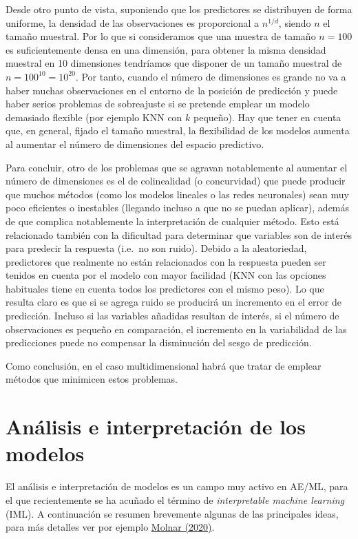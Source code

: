 \documentclass[]{book}
\theoremstyle{break}
\theoremstyle{definition}
\theoremstyle{definition}
\theoremstyle{definition}
\theoremstyle{remark}
\begin{document}
Desde otro punto de vista, suponiendo que los predictores se distribuyen
de forma uniforme, la densidad de las observaciones es proporcional a
\(n^{1/d}\), siendo \(n\) el tamaño muestral. Por lo que si consideramos
que una muestra de tamaño \(n=100\) es suficientemente densa en una
dimensión, para obtener la misma densidad muestral en 10 dimensiones
tendríamos que disponer de un tamaño muestral de
\(n = 100^{10} = 10^{20}\). Por tanto, cuando el número de dimensiones
es grande no va a haber muchas observaciones en el entorno de la
posición de predicción y puede haber serios problemas de sobreajuste si
se pretende emplear un modelo demasiado flexible (por ejemplo KNN con
\(k\) pequeño). Hay que tener en cuenta que, en general, fijado el
tamaño muestral, la flexibilidad de los modelos aumenta al aumentar el
número de dimensiones del espacio predictivo.

Para concluir, otro de los problemas que se agravan notablemente al
aumentar el número de dimensiones es el de colinealidad (o concurvidad)
que puede producir que muchos métodos (como los modelos lineales o las
redes neuronales) sean muy poco eficientes o inestables (llegando
incluso a que no se puedan aplicar), además de que complica notablemente
la interpretación de cualquier método. Esto está relacionado también con
la dificultad para determinar que variables son de interés para predecir
la respuesta (i.e.~no son ruido). Debido a la aleatoriedad, predictores
que realmente no están relacionados con la respuesta pueden ser tenidos
en cuenta por el modelo con mayor facilidad (KNN con las opciones
habituales tiene en cuenta todos los predictores con el mismo peso). Lo
que resulta claro es que si se agrega ruido se producirá un incremento
en el error de predicción. Incluso si las variables añadidas resultan de
interés, si el número de observaciones es pequeño en comparación, el
incremento en la variabilidad de las predicciones puede no compensar la
disminución del sesgo de predicción.

Como conclusión, en el caso multidimensional habrá que tratar de emplear
métodos que minimicen estos problemas.

\section{Análisis e interpretación de los
modelos}\label{anuxe1lisis-e-interpretaciuxf3n-de-los-modelos}

El análisis e interpretación de modelos es un campo muy activo en AE/ML,
para el que recientemente se ha acuñado el término de
\emph{interpretable machine learning} (IML). A continuación se resumen
brevemente algunas de las principales ideas, para más detalles ver por
ejemplo \href{https://christophm.github.io/interpretable-ml-book}{Molnar
(2020)}.
\end{document}

